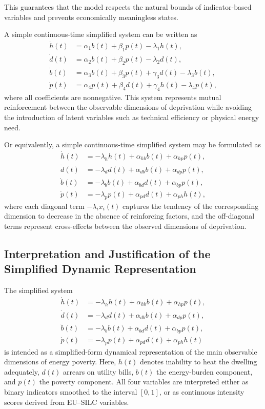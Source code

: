 \documentclass[11pt,a4paper]{article}
\begin{document}
This guarantees that the model respects the natural bounds of indicator-based
variables and prevents economically meaningless states.

A simple continuous-time simplified system can be written as
\begin{align}
\dot{h}(t) &= \alpha_1 b(t)+\beta_1 p(t)-\lambda_1 h(t),\\
\dot{d}(t) &= \alpha_2 b(t)+\beta_2 p(t)-\lambda_2 d(t),\\
\dot{b}(t) &= \alpha_3 b(t)+\beta_3 p(t)+\gamma_3 d(t)-\lambda_3 b(t),\\
\dot{p}(t) &= \alpha_4 p(t)+\beta_4 d(t)+\gamma_4 h(t)-\lambda_4 p(t),
\end{align}
where all coefficients are nonnegative. This system represents mutual reinforcement between the observable dimensions of deprivation while avoiding the introduction of latent variables such as technical efficiency or physical energy need.

Or equivalently, a simple continuous-time simplified system may be formulated as
\begin{align}
\dot{h}(t) &= -\lambda_h h(t) + \alpha_{hb} b(t) + \alpha_{hp} p(t),\\
\dot{d}(t) &= -\lambda_d d(t) + \alpha_{db} b(t) + \alpha_{dp} p(t),\\
\dot{b}(t) &= -\lambda_b b(t) + \alpha_{bd} d(t) + \alpha_{bp} p(t),\\
\dot{p}(t) &= -\lambda_p p(t) + \alpha_{pd} d(t) + \alpha_{ph} h(t),
\end{align}
where each diagonal term \(-\lambda_i x_i(t)\) captures the tendency of the corresponding dimension to decrease in the absence of reinforcing factors, and the off-diagonal terms represent cross-effects between the observed dimensions of deprivation.
\subsection{Interpretation and Justification of the Simplified Dynamic Representation}

The simplified system
\begin{align}
\dot{h}(t) &= -\lambda_h h(t) + \alpha_{hb} b(t) + \alpha_{hp} p(t), \label{eq:red_h}\\
\dot{d}(t) &= -\lambda_d d(t) + \alpha_{db} b(t) + \alpha_{dp} p(t), \label{eq:red_d}\\
\dot{b}(t) &= -\lambda_b b(t) + \alpha_{bd} d(t) + \alpha_{bp} p(t), \label{eq:red_b}\\
\dot{p}(t) &= -\lambda_p p(t) + \alpha_{pd} d(t) + \alpha_{ph} h(t) \label{eq:red_p}
\end{align}
is intended as a simplified-form dynamical representation of the main observable dimensions of energy poverty. Here,
\(h(t)\) denotes inability to heat the dwelling adequately,
\(d(t)\) arrears on utility bills,
\(b(t)\) the energy-burden component,
and \(p(t)\) the poverty component.
All four variables are interpreted either as binary indicators smoothed to the interval \([0,1]\), or as continuous intensity scores derived from EU--SILC variables.
\end{document}

